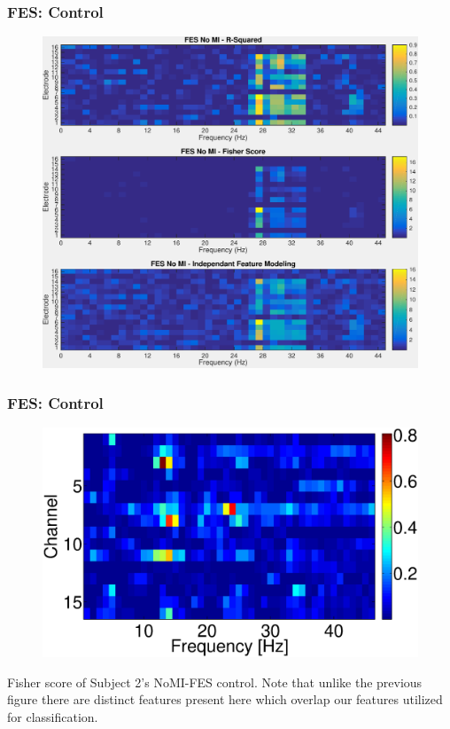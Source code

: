 \documentclass{beamer}
\begin{document}
\begin{frame}%
	\frametitle{FES: Control}
	\begin{figure}
		\includegraphics[width=0.75\linewidth]{fig/FeatSel_3.pdf}
	\end{figure}
\end{frame}


\begin{frame}%
	\frametitle{FES: Control}
	\begin{figure}
		\includegraphics[width=0.75\linewidth]{fig/disc_FESnoMI.eps}
	\end{figure}
Fisher score of Subject 2's NoMI-FES control. Note that unlike the previous figure there are distinct features present here which overlap our features utilized for classification. 
\end{frame}
\end{document}
